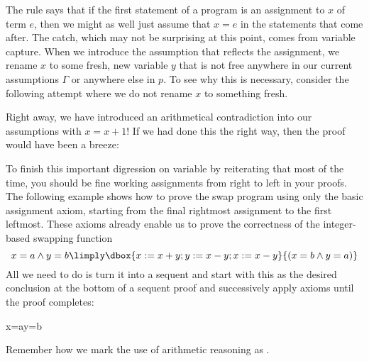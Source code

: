 \documentclass[11pt,twoside]{scrartcl}
\begin{document}
The rule  says that if the first statement of a program is an assignment to $x$ of term $e$, then we might as well just assume that $x = e$ in the statements that come after.
The catch, which may not be surprising at this point, comes from variable capture.
When we introduce the assumption that reflects the assignment, we rename $x$ to some fresh, new variable $y$ that is not free anywhere in our current assumptions $\Gamma$ or anywhere else in $p$.
To see why this is necessary, consider the following attempt where we do not rename $x$ to something fresh.
\begin{sequentdeduction}[array]
 {
}
\end{sequentdeduction}
Right away, we have introduced an arithmetical contradiction into our assumptions with $x = x + 1$!
If we had done this the right way, then the proof would have been a breeze:
\begin{sequentdeduction}[array]
 {
}
\end{sequentdeduction}
To finish this important digression on variable by reiterating that most of the time, you should be fine working assignments from right to left in your proofs.
The following example shows how to prove the swap program using only the basic assignment axiom, starting from the final rightmost assignment to the first leftmost.
These axioms already enable us to prove the correctness of the integer-based swapping function
\[
{x=a\land y=b\limply\dbox{x:=x+y; y:=x-y; x:=x-y}{(x=b\land y=a)}}
\]
All we need to do is turn it into a sequent and start with this as the desired conclusion at the bottom of a sequent proof and successively apply axioms until the proof completes:
\begin{sequentdeduction}[array]
{\lsequent{} {x=a\land y=b\limply{}}}
\end{sequentdeduction}
Remember how we mark the use of arithmetic reasoning as .
\end{document}
